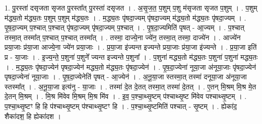 \documentclass[17pt]{extarticle}
\begin{document}
1. पु॒रस्ता॑ दसृजता सृजत पु॒रस्ता᳚त् पु॒रस्ता॑ दसृजत । . अ॒सृ॒ज॒त॒ प॒शुम् प॒शु म॑सृजता सृजत प॒शुम् । . प॒शुम् म॑द्ध्य॒तो म॑द्ध्य॒तः प॒शुम् प॒शुम् म॑द्ध्य॒तः । . म॒द्ध्य॒तः पृ॑षदा॒ज्यम् पृ॑षदा॒ज्यम् म॑द्ध्य॒तो म॑द्ध्य॒तः पृ॑षदा॒ज्यम् । . पृ॒ष॒दा॒ज्यम् प॒श्चात् प॒श्चात् पृ॑षदा॒ज्यम् पृ॑षदा॒ज्यम् प॒श्चात् । . पृ॒ष॒दा॒ज्यमिति॑ पृषत् - आ॒ज्यम् । . प॒श्चात् तस्मा॒त् तस्मा᳚त् प॒श्चात् प॒श्चात् तस्मा᳚त् । . तस्मा॒ दाज्ये॒ना ज्ये॑न॒ तस्मा॒त् तस्मा॒ दाज्ये॑न । . आज्ये॑न प्रया॒जाः प्र॑या॒जा आज्ये॒ना ज्ये॑न प्रया॒जाः । . प्र॒या॒जा इ॑ज्यन्त इज्यन्ते प्रया॒जाः प्र॑या॒जा इ॑ज्यन्ते । . प्र॒या॒जा इति॑ प्र - या॒जाः । . इ॒ज्य॒न्ते॒ प॒शुना॑ प॒शुने᳚ ज्यन्त इज्यन्ते प॒शुना᳚ । . प॒शुना॑ मद्ध्य॒तो म॑द्ध्य॒तः प॒शुना॑ प॒शुना॑ मद्ध्य॒तः । . म॒द्ध्य॒तः पृ॑षदा॒ज्येन॑ पृषदा॒ज्येन॑ मद्ध्य॒तो म॑द्ध्य॒तः पृ॑षदा॒ज्येन॑ । . पृ॒ष॒दा॒ज्येना॑ नूया॒जा अ॑नूया॒जाः पृ॑षदा॒ज्येन॑ पृषदा॒ज्येना॑ नूया॒जाः । . पृ॒ष॒दा॒ज्येनेति॑ पृषत् - आ॒ज्येन॑ । . अ॒नू॒या॒जा स्तस्मा॒त् तस्मा॑ दनूया॒जा अ॑नूया॒जा स्तस्मा᳚त् । . अ॒नू॒या॒जा इत्य॑नु - या॒जाः । . तस्मा॑ दे॒त दे॒तत् तस्मा॒त् तस्मा॑ दे॒तत् । . ए॒तन् मि॒श्रम् मि॒श्र मे॒त दे॒तन् मि॒श्रम् । . मि॒श्र मि॑वेव मि॒श्रम् मि॒श्र मि॑व । . इ॒व॒ प॒श्चा॒थ्सृ॒ष्टम् प॑श्चाथ्सृ॒ष्ट मि॑वेव पश्चाथ्सृ॒ष्टम् । . प॒श्चा॒थ्सृ॒ष्टꣳ हि हि प॑श्चाथ्सृ॒ष्टम् प॑श्चाथ्सृ॒ष्टꣳ हि । . प॒श्चा॒थ्सृ॒ष्टमिति॑ पश्चात् - सृ॒ष्टम् । . ह्येका॑द॒ शैका॑दश॒ हि ह्येका॑दश । \newline
\end{document}
